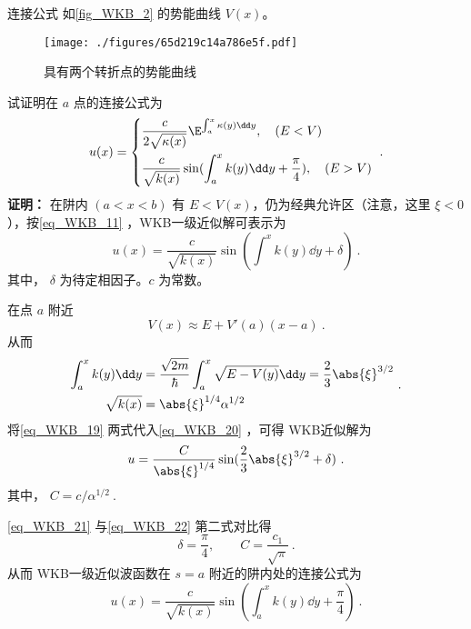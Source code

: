 \begin{example}{连接公式}
如\autoref{fig_WKB_2} 的势能曲线 $V(x)$。
\begin{figure}[ht]
\centering
\texttt{[image: ./figures/65d219c14a786e5f.pdf]}
\caption{具有两个转折点的势能曲线} \label{fig_WKB_2}
\end{figure}
试证明在 $a$ 点的连接公式为
\begin{equation}
u(x)=\left\{\begin{aligned}
&\frac{c}{2\sqrt{\kappa(x)}}\E^{\int_a^x\kappa(y)\dd y} ,\quad(E<V)\\
&\frac{c}{\sqrt{k(x)}}\sin(\int_a^x k(y)\dd y+\frac{\pi}{4}),\quad(E>V)
\end{aligned}\right.~.
\end{equation}
\textbf{证明：}
在阱内 $(a<x<b)$ 有 $E<V(x)$，仍为经典允许区（注意，这里 $\xi<0$），按\autoref{eq_WKB_11} ，WKB一级近似解可表示为
\begin{equation}\label{eq_WKB_20}
u(x)=\frac{c}{\sqrt{k(x)}}\sin(\int^x k(y)\dd y+\delta)~.
\end{equation}
其中， $\delta$ 为待定相因子。$c$ 为常数。

在点 $a$ 附近
\begin{equation}
V(x)\approx E+V'(a)(x-a)~.
\end{equation}
从而
\begin{equation}\label{eq_WKB_19}
\begin{aligned}
\int_a^xk(y)\dd y&=
\frac{\sqrt{2m}}{\hbar}\int_a^x\sqrt{E-V(y)}\dd y=\frac{2}{3}\abs{\xi}^{3/2}
\\
\sqrt{k(x)}
&=
\abs{\xi}^{1/4}\alpha^{1/2}
\end{aligned}~.
\end{equation}
将\autoref{eq_WKB_19} 两式代入\autoref{eq_WKB_20} ，可得 WKB近似解为
\begin{equation}\label{eq_WKB_21}
u=
\frac{C}{\abs{\xi}^{1/4}}\sin({\frac{2}{3}\abs{\xi}^{3/2}+\delta})~.
\end{equation}
其中， $C=c/\alpha^{1/2}~.$

\autoref{eq_WKB_21} 与\autoref{eq_WKB_22} 第二式对比得
\begin{equation}\label{eq_WKB_25}
\delta=\frac{\pi}{4},\qquad C=\frac{c_1}{\sqrt{\pi}}~.
\end{equation}
从而 WKB一级近似波函数在 $s=a$ 附近的阱内处的连接公式为
\begin{equation}
u(x)=\frac{c}{\sqrt{k(x)}}\sin(\int_a^x k(y)\dd y+\frac{\pi}{4})~.
\end{equation}


\end{example}
